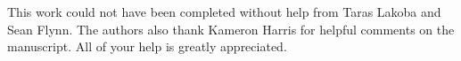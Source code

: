 This work could not have been completed without help from Taras Lakoba and Sean Flynn.
The authors also thank Kameron Harris for helpful comments on the manuscript.
All of your help is greatly appreciated.
